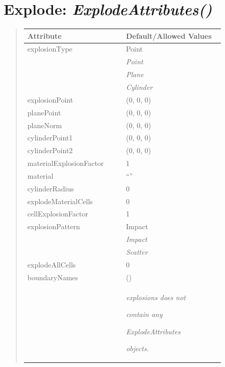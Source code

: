 \documentclass[letterpaper,10pt,english]{sphinxmanual}
\begin{document}
\section{\textbf{Explode}: \emph{ExplodeAttributes()}}
\label{attributes:explode-explodeattributes}
\begin{DUlineblock}{0em}
\item[] 
\end{DUlineblock}
\begin{quote}

\begin{tabular}{|p{0.475\linewidth}|p{0.475\linewidth}|}
\hline

\textbf{Attribute}
 & 
\textbf{Default/Allowed Values}
\\
\hline
explosionType
 & 
Point
\\
\hline & 
\emph{Point}
\\
\hline & 
\emph{Plane}
\\
\hline & 
\emph{Cylinder}
\\
\hline
explosionPoint
 & 
(0, 0, 0)
\\
\hline
planePoint
 & 
(0, 0, 0)
\\
\hline
planeNorm
 & 
(0, 0, 0)
\\
\hline
cylinderPoint1
 & 
(0, 0, 0)
\\
\hline
cylinderPoint2
 & 
(0, 0, 0)
\\
\hline
materialExplosionFactor
 & 
1
\\
\hline
material
 & 
``''
\\
\hline
cylinderRadius
 & 
0
\\
\hline
explodeMaterialCells
 & 
0
\\
\hline
cellExplosionFactor
 & 
1
\\
\hline
explosionPattern
 & 
Impact
\\
\hline & 
\emph{Impact}
\\
\hline & 
\emph{Scatter}
\\
\hline
explodeAllCells
 & 
0
\\
\hline
boundaryNames
 & 
()
\\
\hline & 
\begin{DUlineblock}{0em}
\item[] \emph{explosions does not}
\item[] \emph{contain any}
\item[] \emph{ExplodeAttributes}
\item[] \emph{objects.}
\end{DUlineblock}
\\
\hline\end{tabular}

\end{quote}
\end{document}
